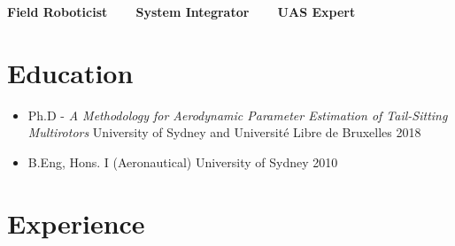 \documentclass[12pt,letter,sans]{moderncv}
\begin{document}
\makecvtitle 
\vspace{-26pt}
\begin{center}
	\textbf{Field Roboticist~~~~System Integrator~~~~UAS Expert}
\end{center}


\section{Education}

\vspace{4pt}

\begin{itemize}

\item{
    \cventry
    {}
    {Ph.D - \textit{A Methodology for Aerodynamic Parameter Estimation of Tail-Sitting Multirotors}}
    {University of Sydney and Universit\'e Libre de Bruxelles}    
    {2018}    
    {} 
    {}
}

\item{
    \cventry
    {}
    {B.Eng, Hons. I (Aeronautical)}
    {University of Sydney}
    {2010}
    {}
    {}
}

\end{itemize}

\vspace{2pt}


\section{Experience}

\vspace{4pt}
\end{document}
